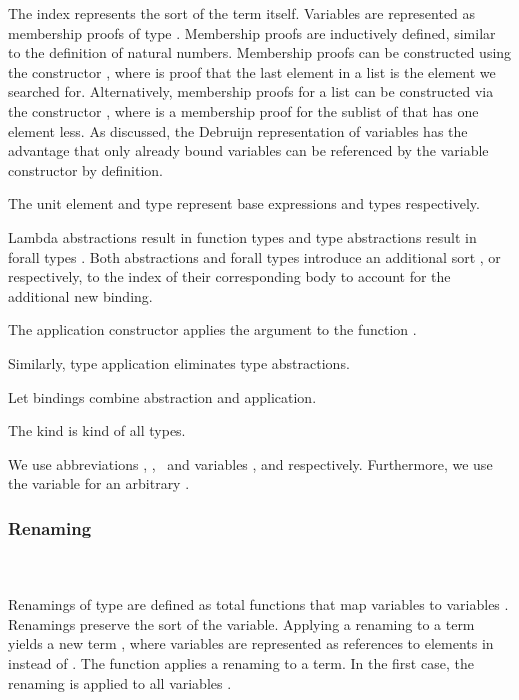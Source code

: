 \noindent The index  represents the sort of the term itself.
\newpage
\FTerm
Variables   are represented as membership proofs of type   .
Membership proofs are inductively defined, similar to the definition of natural numbers. 
Membership proofs can be constructed using the constructor , where  is proof that the last element in a list  is the element we searched for. 
Alternatively, membership proofs for a list  can be constructed via the constructor  , where  is a membership proof for the sublist  of  that has one element less. 
As discussed, the Debruijn representation of variables has the advantage that only already bound variables can be referenced by the variable constructor by definition. 

\noindent The unit element  and type  represent base expressions and types respectively. 

\noindent Lambda abstractions   result in function types    and type abstractions   result in forall types  . 
Both abstractions and forall types introduce an additional sort , or  respectively, to the index  of their corresponding body to account for the additional new binding.

\noindent The application constructor    applies the argument  to the function .

\noindent Similarly, type application    eliminates type abstractions. 

\noindent Let bindings     combine abstraction and application. 

\noindent The kind  is kind of all types.

\noindent We use abbreviations \FVar, \FExpr, \FType\ and variables ,  and  respectively. Furthermore, we use the variable  for an arbitrary   .

\subsubsection{Renaming}\hfill\\\\
Renamings  of type    are defined as total functions that map variables    to variables   . 
Renamings preserve the sort  of the variable.
\FRen
Applying a renaming    to a term    yields a new term   , where variables are represented as references to elements in  instead of . The function  applies a renaming to a term.
\Fren
In the first case, the renaming is applied to all variables .

